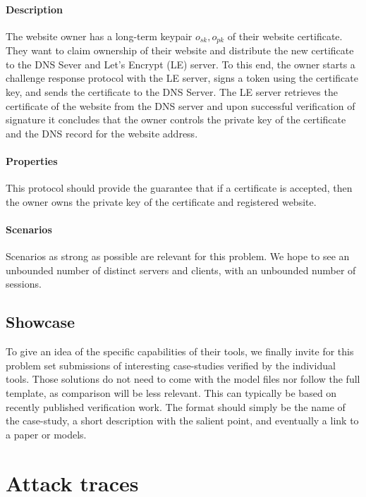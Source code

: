 \documentclass[11pt]{article}
\newcommand{\sfsk}{\mathit{sk}}
\newcommand{\sfpk}{\mathit{pk}}
\begin{document}
 \paragraph{Description} The website owner has a long-term keypair $o_\sfsk,o_\sfpk$ of their website certificate.
They want to claim ownership of their website and distribute the new certificate to the DNS Sever and Let's Encrypt (LE) server. To this end, the owner starts a challenge response protocol with the LE server, signs a token using the certificate key, and sends the certificate to the DNS Server. The LE server retrieves the certificate of the website from the DNS server and upon successful verification of signature it concludes that the owner controls the private key of the certificate and the DNS record for the website address.

\paragraph{Properties} This protocol should provide the guarantee that if a certificate is accepted, then the owner owns the private key of the certificate and registered website.

\paragraph{Scenarios} Scenarios as strong as possible are relevant for this problem. We hope to see an unbounded number of distinct servers and clients, with an unbounded number of sessions. 

\subsection{Showcase}\label{prob:showcase}

To give an idea of the specific capabilities of their tools, we finally invite for this problem set submissions of interesting case-studies verified by the individual tools. Those solutions do not need to come with the model files nor follow the full template, as comparison will be less relevant. This can typically be based on recently published verification work. The format should simply be the name of the case-study, a short description with the salient point, and eventually a link to a paper or models.

\appendix

\section{Attack traces}\label{app:attacks}
\end{document}
